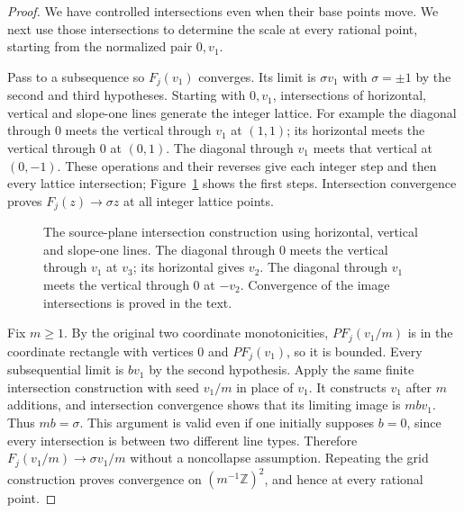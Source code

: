 \begin{proof}
We have controlled intersections even when their base points move.
We next use those intersections to determine the scale at every rational
point, starting from the normalized pair $0,v_1$.

Pass to a subsequence so $F_j(v_1)$ converges.  Its limit is
$\sigma v_1$ with $\sigma=\pm1$ by the second and third hypotheses.
Starting with $0,v_1$, intersections of horizontal, vertical and
slope-one lines generate the integer lattice.  For example the
diagonal through $0$ meets the vertical through $v_1$ at $(1,1)$;
its horizontal meets the vertical through $0$ at $(0,1)$.
The diagonal through $v_1$ meets that vertical at $(0,-1)$.
These operations and their reverses give each integer step and then
every lattice intersection; Figure~\ref{fig:three-foliation-grid} shows
the first steps. Intersection convergence proves
$F_j(z)\to\sigma z$ at all integer lattice points.

\begin{figure}[htbp]
\centering
{}
\caption{The source-plane intersection construction using horizontal,
vertical and slope-one lines. The diagonal through $0$ meets the vertical
through $v_1$ at $v_3$; its horizontal gives $v_2$. The diagonal through
$v_1$ meets the vertical through $0$ at $-v_2$. Convergence of the image
intersections is proved in the text.}
\label{fig:three-foliation-grid}
\end{figure}

Fix $m\ge1$.  By the original two coordinate monotonicities,
$P F_j(v_1/m)$ is in the coordinate rectangle with vertices $0$ and
$P F_j(v_1)$, so it is bounded.  Every subsequential limit is $b v_1$
by the second hypothesis.  Apply the same finite intersection
construction with seed $v_1/m$ in place of $v_1$.  It constructs
$v_1$ after $m$ additions, and intersection convergence shows that
its limiting image is $mbv_1$.  Thus $mb=\sigma$.
This argument is valid even if one initially supposes $b=0$, since
every intersection is between two different line types.  Therefore
$F_j(v_1/m)\to\sigma v_1/m$ without a noncollapse assumption.
Repeating the grid construction proves convergence on
$(m^{-1}\mathbb Z)^2$, and hence at every rational point.


\end{proof}
